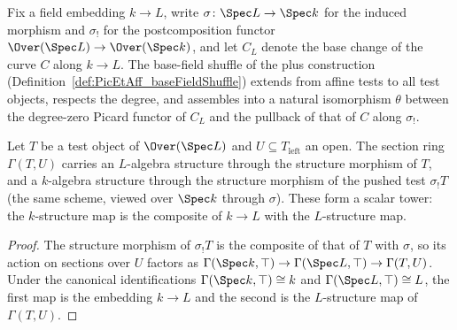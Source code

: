 Fix a field embedding \(k \to L\), write \(\sigma \colon \Spec L \to \Spec k\) for the
induced morphism and \(\sigma_{!}\) for the postcomposition functor
\(\Over(\Spec L) \to \Over(\Spec k)\), and let \(C_L\) denote the base change of the
curve \(C\) along \(k \to L\).  The base-field shuffle of the plus construction
(Definition~\ref{def:PicEtAff_baseFieldShuffle}) extends from affine tests to all test
objects, respects the degree, and assembles into a natural isomorphism \(\theta\)
between the degree-zero Picard functor of \(C_L\) and the pullback of that of \(C\)
along \(\sigma_{!}\).

\begin{lemma}
  \label{lem:isScalarTower_sections_map}
  \leanok
  Let \(T\) be a test object of \(\Over(\Spec L)\) and \(U \subseteq T_{\mathrm{left}}\)
  an open.  The section ring \(\Gamma(T, U)\) carries an \(L\)-algebra structure
  through the structure morphism of \(T\), and a \(k\)-algebra structure through the
  structure morphism of the pushed test \(\sigma_{!}T\) (the same scheme, viewed over
  \(\Spec k\) through \(\sigma\)).  These form a scalar tower: the \(k\)-structure map
  is the composite of \(k \to L\) with the \(L\)-structure map.
\end{lemma}
\begin{proof}
  \leanok
  The structure morphism of \(\sigma_{!}T\) is the composite of that of \(T\) with
  \(\sigma\), so its action on sections over \(U\) factors as
  \(\Gamma(\Spec k, \top) \to \Gamma(\Spec L, \top) \to \Gamma(T, U)\).  Under the
  canonical identifications \(\Gamma(\Spec k, \top) \cong k\) and
  \(\Gamma(\Spec L, \top) \cong L\), the first map is the embedding \(k \to L\) and
  the second is the \(L\)-structure map of \(\Gamma(T, U)\).
\end{proof}

